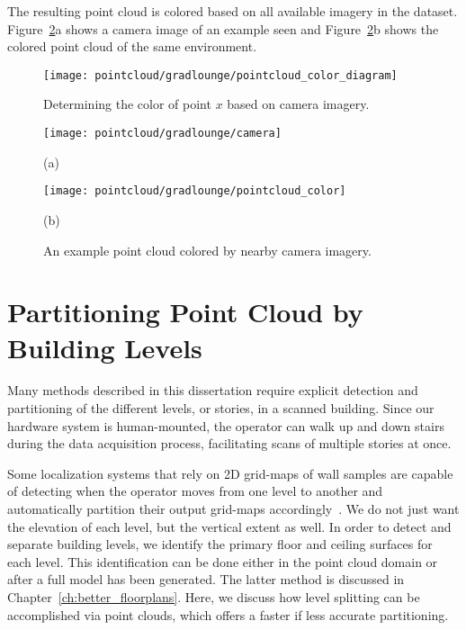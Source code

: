 \documentclass[12pt,onecolumn,oneside]{book}
\begin{document}
The resulting point cloud is colored based on all available imagery in the dataset.  Figure~\ref{fig:pointcloud_color}a shows a camera image of an example seen and Figure~\ref{fig:pointcloud_color}b shows the colored point cloud of the same environment.

\begin{figure}
	\centerline{\texttt{[image: pointcloud/gradlounge/pointcloud\_color\_diagram]}}
	\caption{Determining the color of point $x$ based on camera imagery.}
	\label{fig:pointcloud_color_diagram}
\end{figure}

\begin{figure}
	\begin{minipage}[t]{0.5\linewidth}
		\centerline{\texttt{[image: pointcloud/gradlounge/camera]}}
		\centerline{(a)}
	\end{minipage}
	\hfill
	\begin{minipage}[t]{0.5\linewidth}
		\centerline{\texttt{[image: pointcloud/gradlounge/pointcloud\_color]}}
		\centerline{(b)}
	\end{minipage}

	\caption{An example point cloud colored by nearby camera imagery.}
	\label{fig:pointcloud_color}
\end{figure}

\section{Partitioning Point Cloud by Building Levels}
\label{sec:pointcloud_level_split}

Many methods described in this dissertation require explicit detection and partitioning of the different levels, or stories, in a scanned building.  Since our hardware system is human-mounted, the operator can walk up and down stairs during the data acquisition process, facilitating scans of multiple stories at once.  

Some localization systems that rely on 2D grid-maps of wall samples are capable of detecting when the operator moves from one level to another and automatically partition their output grid-maps accordingly~\cite{MITBackpack}.  We do not just want the elevation of each level, but the vertical extent as well.  In order to detect and separate building levels, we identify the primary floor and ceiling surfaces for each level.  This identification can be done either in the point cloud domain or after a full model has been generated.  The latter method is discussed in Chapter~\ref{ch:better_floorplans}.  Here, we discuss how level splitting can be accomplished via point clouds, which offers a faster if less accurate partitioning.
\end{document}
